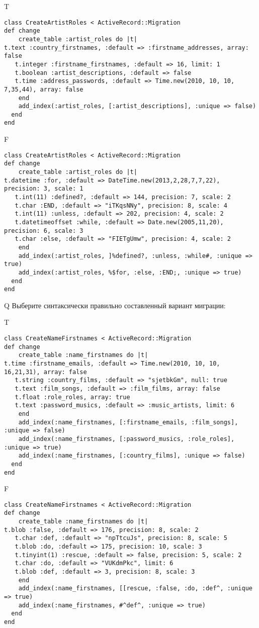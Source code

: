 T
\begin{verbatim}
class CreateArtistRoles < ActiveRecord::Migration
def change
	create_table :artist_roles do |t|
t.text :country_firstnames, :default => :firstname_addresses, array: false
   t.integer :firstname_firstnames, :default => 16, limit: 1
   t.boolean :artist_descriptions, :default => false
   t.time :address_passwords, :default => Time.new(2010, 10, 10, 7,35,44), array: false
   	end
	add_index(:artist_roles, [:artist_descriptions], :unique => false)
  end 
end

\end{verbatim}

F
\begin{verbatim}
class CreateArtistRoles < ActiveRecord::Migration
def change
	create_table :artist_roles do |t|
t.datetime :for, :default => DateTime.new(2013,2,28,7,7,22), precision: 3, scale: 1
   t.int(11) :defined?, :default => 144, precision: 7, scale: 2
   t.char :END, :default => "iTKqsNNy", precision: 8, scale: 4
   t.int(11) :unless, :default => 202, precision: 4, scale: 2
   t.datetimeoffset :while, :default => Date.new(2005,11,20), precision: 6, scale: 3
   t.char :else, :default => "FIETgUmw", precision: 4, scale: 2
   	end
	add_index(:artist_roles, ]%defined?, :unless, :while#, :unique => true)
 	add_index(:artist_roles, %$for, :else, :END;, :unique => true)
  end 
end

\end{verbatim}

Q
Выберите синтаксически правильно составленный вариант миграции:

T
\begin{verbatim}
class CreateNameFirstnames < ActiveRecord::Migration
def change
	create_table :name_firstnames do |t|
t.time :firstname_emails, :default => Time.new(2010, 10, 10, 16,21,31), array: false
   t.string :country_films, :default => "sjetbkGm", null: true
   t.text :film_songs, :default => :film_films, array: false
   t.float :role_roles, array: true
   t.text :password_musics, :default => :music_artists, limit: 6
   	end
	add_index(:name_firstnames, [:firstname_emails, :film_songs], :unique => false)
 	add_index(:name_firstnames, [:password_musics, :role_roles], :unique => true)
 	add_index(:name_firstnames, [:country_films], :unique => false)
  end 
end

\end{verbatim}

F
\begin{verbatim}
class CreateNameFirstnames < ActiveRecord::Migration
def change
	create_table :name_firstnames do |t|
t.blob :false, :default => 176, precision: 8, scale: 2
   t.char :def, :default => "npTtcuJs", precision: 8, scale: 5
   t.blob :do, :default => 175, precision: 10, scale: 3
   t.tinyint(1) :rescue, :default => false, precision: 5, scale: 2
   t.char :do, :default => "VUKdmPkc", limit: 6
   t.blob :def, :default => 3, precision: 8, scale: 3
   	end
	add_index(:name_firstnames, [[rescue, :false, :do, :def^, :unique => true)
 	add_index(:name_firstnames, #^def^, :unique => true)
  end 
end

\end{verbatim}

